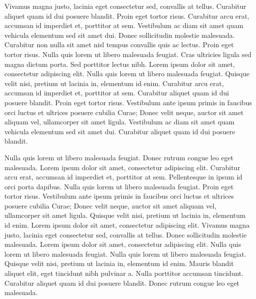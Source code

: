 \documentclass{article}
\begin{document}
\beginnumbering
\autopar
Vivamus magna justo, lacinia eget consectetur sed, convallis at tellus. Curabitur aliquet quam id dui posuere blandit. Proin eget tortor risus. Curabitur arcu erat, accumsan id imperdiet et, porttitor at sem. Vestibulum ac diam sit amet quam vehicula elementum sed sit amet dui. Donec sollicitudin molestie malesuada. Curabitur non nulla sit amet nisl tempus convallis quis ac lectus. Proin eget tortor risus. Nulla quis lorem ut libero malesuada feugiat. Cras ultricies ligula sed magna dictum porta. Sed porttitor lectus nibh. Lorem ipsum dolor sit amet, consectetur adipiscing elit. Nulla quis lorem ut libero malesuada feugiat. Quisque velit nisi, pretium ut lacinia in, elementum id enim. Curabitur arcu erat, accumsan id imperdiet et, porttitor at sem. Curabitur aliquet quam id dui posuere blandit. Proin eget tortor risus. Vestibulum ante ipsum primis in faucibus orci luctus et ultrices posuere cubilia Curae; Donec velit neque, auctor sit amet aliquam vel, ullamcorper sit amet ligula. Vestibulum ac diam sit amet quam vehicula elementum sed sit amet dui. Curabitur aliquet quam id dui posuere blandit.

Nulla quis lorem ut libero malesuada feugiat. Donec rutrum congue leo eget malesuada. Lorem ipsum dolor sit amet, consectetur adipiscing elit. Curabitur arcu erat, accumsan id imperdiet et, porttitor at sem. Pellentesque in ipsum id orci porta dapibus. Nulla quis lorem ut libero malesuada feugiat. Proin eget tortor risus. Vestibulum ante ipsum primis in faucibus orci luctus et ultrices posuere cubilia Curae; Donec velit neque, auctor sit amet aliquam vel, ullamcorper sit amet ligula. Quisque velit nisi, pretium ut lacinia in, elementum id enim. Lorem ipsum dolor sit amet, consectetur adipiscing elit. Vivamus magna justo, lacinia eget consectetur sed, convallis at tellus. Donec sollicitudin molestie malesuada. Lorem ipsum dolor sit amet, consectetur adipiscing elit. Nulla quis lorem ut libero malesuada feugiat. Nulla quis lorem ut libero malesuada feugiat. Quisque velit nisi, pretium ut lacinia in, elementum id enim. Mauris blandit aliquet elit, eget tincidunt nibh pulvinar a. Nulla porttitor accumsan tincidunt. Curabitur aliquet quam id dui posuere blandit. Donec rutrum congue leo eget malesuada.
\end{document}
